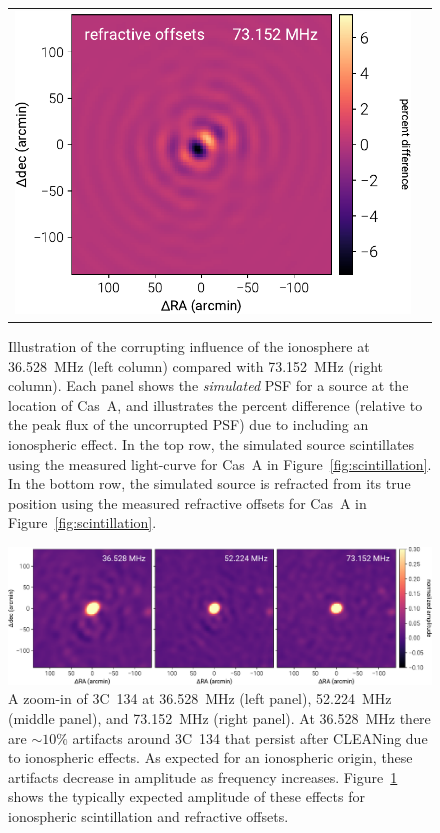 \documentclass[twocolumn]{aastex61}
\begin{document}
\begin{figure}[t]
\begin{tabular}{cc}
        \includegraphics[width=\columnwidth]{figures/ionospheric-simulations/refraction-18} \\
    \end{tabular}
    \caption{
        Illustration of the corrupting influence of the ionosphere at 36.528~MHz (left column)
        compared with 73.152~MHz (right column). Each panel shows the \textit{simulated} PSF for a
        source at the location of Cas~A, and illustrates the percent difference (relative to the
        peak flux of the uncorrupted PSF) due to including an ionospheric effect.  In the top row,
        the simulated source scintillates using the measured light-curve for Cas~A in
        Figure~\ref{fig:scintillation}. In the bottom row, the simulated source is refracted from
        its true position using the measured refractive offsets for Cas~A in
        Figure~\ref{fig:scintillation}.
    }
    \label{fig:ionospheric-simulations}
\end{figure}

\begin{figure}[t]
    \centering
    \includegraphics[width=\textwidth]{figures/postage-stamps/3C134}
    \caption{
        A zoom-in of 3C~134 at 36.528~MHz (left panel), 52.224~MHz (middle panel), and 73.152~MHz
        (right panel). At 36.528~MHz there are $\sim10\%$ artifacts around 3C~134 that persist after
        CLEANing due to ionospheric effects. As expected for an ionospheric origin, these artifacts
        decrease in amplitude as frequency increases. Figure~\ref{fig:ionospheric-simulations} shows
        the typically expected amplitude of these effects for ionospheric scintillation and
        refractive offsets.
    }
    \label{fig:3C134}
\end{figure}
\end{document}
